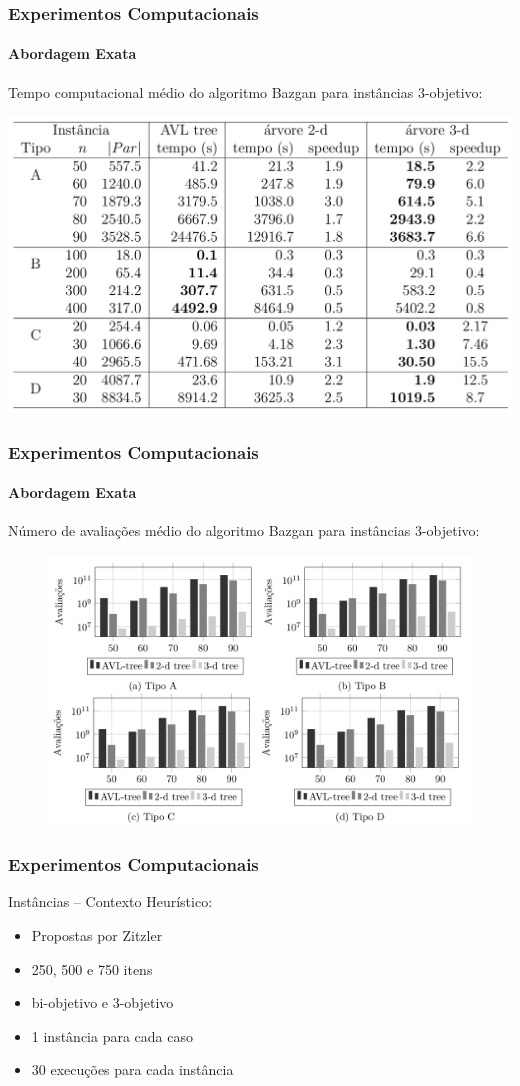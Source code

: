 \documentclass[10pt,xcolor=table,fleqn]{beamer}
\begin{document}
\begin{frame}
  \frametitle{Experimentos Computacionais}
  \framesubtitle{Abordagem Exata}
  Tempo computacional médio do algoritmo Bazgan para instâncias $3$-objetivo:
  \scriptsize
  \begin{table}[h]
    \includegraphics[scale=0.25]{../tab/cpu3dim}
  \end{table}
\end{frame}

\begin{frame}
  \frametitle{Experimentos Computacionais}
  \framesubtitle{Abordagem Exata}
  Número de avaliações médio do algoritmo Bazgan para instâncias $3$-objetivo:
  \begin{figure}[H]
    \includegraphics[scale=0.3]{../tab/cmp/3dim}
  \end{figure}
\end{frame}

\begin{frame}
	\frametitle{Experimentos Computacionais}
  \begin{block}{Instâncias -- Contexto Heurístico:}
    \begin{itemize}
      \item{ Propostas por Zitzler }
      \item{ 250, 500 e 750 itens }
      \item{ bi-objetivo e 3-objetivo }
      \item{ 1 instância para cada caso }
      \item{ 30 execuções para cada instância }
    \end{itemize}
  \end{block}
\end{frame}
\end{document}

